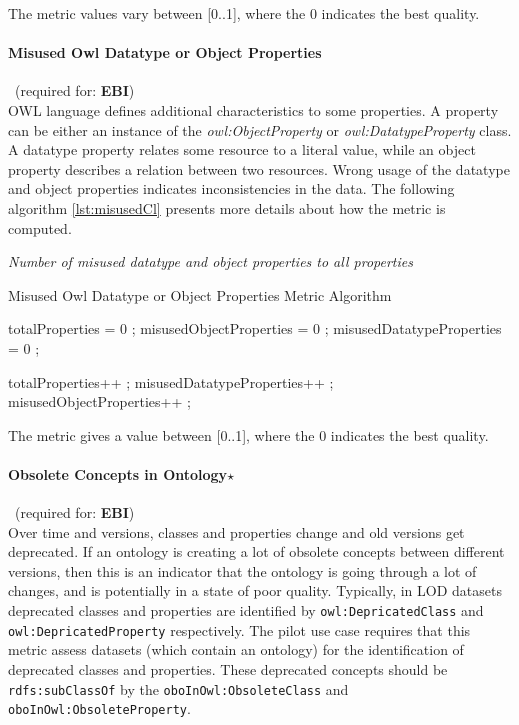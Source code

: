 The metric values vary between  [0..1], where  the 0 indicates the best quality.

\paragraph{Misused Owl Datatype or Object Properties}~(required for: \textbf{EBI})~\\
OWL language defines additional characteristics to some properties. 
A property can be either an instance of the \textit{owl:ObjectProperty} or \textit{owl:DatatypeProperty} class.
A datatype property relates some resource to a literal value, while an object property describes a relation between two resources.
Wrong usage of the datatype and object properties indicates inconsistencies in the data.
The following algorithm  \ref{lst:misusedCl} presents more details about how the metric is computed.

\begin{mdframed}[style=metricdefinition]
\emph{Number of misused datatype and object properties to all properties}
\end{mdframed}

\begin{algorithm}
\caption{Misused Owl Datatype or Object Properties Metric Algorithm} \label{lst:misusedCl}
\begin{algorithmic}[1]
\State totalProperties = 0 ;
\State misusedObjectProperties = 0 ;
\State misusedDatatypeProperties = 0 ;
\EndProcedure

 totalProperties++ ;\EndIf 
{} misusedDatatypeProperties++ ; \EndIf 
{} misusedObjectProperties++ ; \EndIf 
\EndProcedure
\end{algorithmic}
\end{algorithm}

The metric gives a value between [0..1], where  the 0 indicates the best quality.

\paragraph{Obsolete Concepts in Ontology$\star$}~(required for: \textbf{EBI})~\\
Over time and versions, classes and properties change and old versions get deprecated.
If an ontology is creating a lot of obsolete concepts between different versions, then this is an indicator that the ontology is going through a lot of changes, and is potentially in a state of poor quality.
Typically, in LOD datasets deprecated classes and properties are identified by \texttt{owl:DepricatedClass} and \texttt{owl:DepricatedProperty} respectively.
The pilot use case requires that this metric assess datasets (which contain an ontology) for the identification of deprecated classes and properties.
These deprecated concepts should be \texttt{rdfs:subClassOf} by the \texttt{oboInOwl:ObsoleteClass} and \texttt{oboInOwl:ObsoleteProperty}.

